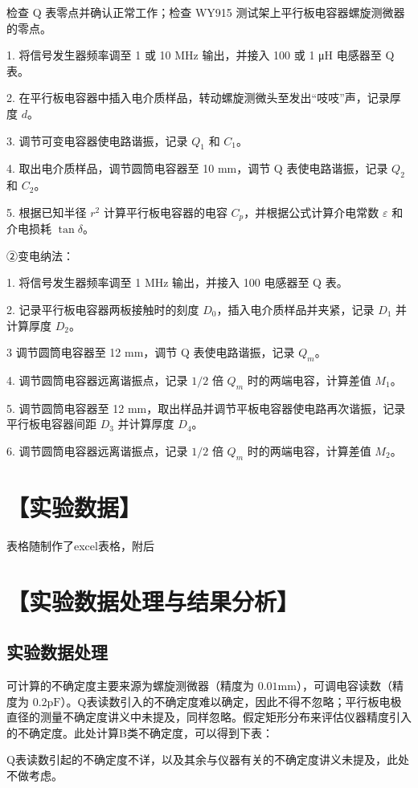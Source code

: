 \documentclass[a4paper,utf8]{article}
\begin{document}
检查 Q 表零点并确认正常工作；检查 WY915 测试架上平行板电容器螺旋测微器的零点。

1. 将信号发生器频率调至 1 或 10 MHz 输出，并接入 100 或 1 μH 电感器至 Q 表。

2. 在平行板电容器中插入电介质样品，转动螺旋测微头至发出“吱吱”声，记录厚度 $d$。

3. 调节可变电容器使电路谐振，记录 $Q_1$ 和 $C_1$。

4. 取出电介质样品，调节圆筒电容器至 10 mm，调节 Q 表使电路谐振，记录 $Q_2$ 和 $C_2$。

5. 根据已知半径 $r^2$ 计算平行板电容器的电容 $C_p$，并根据公式计算介电常数 $\varepsilon$ 和介电损耗 $\tan\delta$。

②变电纳法：

1. 将信号发生器频率调至 1 MHz 输出，并接入 100 电感器至 Q 表。

2. 记录平行板电容器两板接触时的刻度 $D_0$，插入电介质样品并夹紧，记录 $D_1$ 并计算厚度 $D_2$。

3 调节圆筒电容器至 12 mm，调节 Q 表使电路谐振，记录 $Q_m$。

4. 调节圆筒电容器远离谐振点，记录 $1/2$ 倍 $Q_m$ 时的两端电容，计算差值 $M_1$。

5. 调节圆筒电容器至 12 mm，取出样品并调节平板电容器使电路再次谐振，记录平行板电容器间距 $D_3$ 并计算厚度 $D_4$。

6. 调节圆筒电容器远离谐振点，记录 $1/2$ 倍 $Q_m$ 时的两端电容，计算差值 $M_2$。

\section*{【实验数据】}
    表格随制作了excel表格，附后

\section*{【实验数据处理与结果分析】}

\subsection*{实验数据处理}
可计算的不确定度主要来源为螺旋测微器（精度为 $ 0.01 \unit{\milli\meter} $），可调电容读数（精度为 $0.2\unit{\pF}$）。Q表读数引入的不确定度难以确定，因此不得不忽略；平行板电极直径的测量不确定度讲义中未提及，同样忽略。假定矩形分布来评估仪器精度引入的不确定度。此处计算B类不确定度，可以得到下表：\par
Q表读数引起的不确定度不详，以及其余与仪器有关的不确定度讲义未提及，此处不做考虑。
\end{document}
